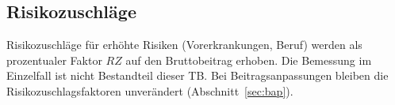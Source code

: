 \subsection{Risikozuschläge}\label{sec:risikozuschlag}

Risikozuschläge für erhöhte Risiken (Vorerkrankungen, Beruf) werden als
prozentualer Faktor $RZ$ auf den Bruttobeitrag erhoben. Die Bemessung
im Einzelfall ist nicht Bestandteil dieser TB. Bei Beitragsanpassungen
bleiben die Risikozuschlagsfaktoren unverändert
(Abschnitt~\ref{sec:bap}).
